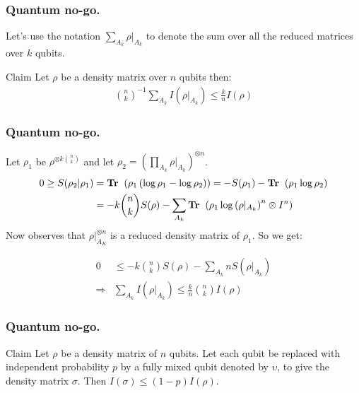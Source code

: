 \documentclass{beamer}
\begin{document}
\begin{frame}
  \frametitle{Quantum no-go.}
  Let's use the notation $\sum_{A_k}\rho|_{A_k}$ to denote the sum over all the reduced matrices over $k$ qubits.  
\begin{block}{Claim}
  Let $\rho$ be a density matrix over $n$ qubits then:  
  \begin{equation*}
    \begin{split}
      { n \choose k }^{-1}\sum_{A_k} I(\rho|_{A_k}) \le \frac{k}{n}I(\rho)
    \end{split}
  \end{equation*}
\end{block}
\end{frame}
\begin{frame}
  \frametitle{Quantum no-go.}
Let $\rho_{1}$ be $\rho^{\otimes k { n \choose k } }$ and let $\rho_{2} = \left( \prod_{A_{k}} \rho |_{A_{k}} \right)^{\otimes n}$.  
  \begin{equation*}
    \begin{split}
      0 \ge S(\rho_{2} | \rho_{1} ) &= \textbf{Tr } \left( \rho_{1} \left( \log \rho_{1} - \log \rho_{2} \right) \right) = -S(\rho_{1}) - \textbf{Tr } \left( \rho_{1} \log \rho_{2} \right) \\ 
      &= -k { n \choose k } S(\rho) - \sum_{A_k} \textbf{Tr } \left( \rho_{1} \log \left( \rho|_{A_{k}} \right)^n \otimes I^n \right)
    \end{split}
  \end{equation*}
  Now observes that $ \rho|_{A_{K}}^{\otimes n} $ is a reduced density matrix of $\rho_{1}$. So we get: 

  \begin{equation*}
    \begin{split}
      0 & \le  -k { n \choose k } S(\rho) - \sum_{A_k} n S\left( \rho |_{A_{k}} \right) \\ 
      \Rightarrow  & \sum_{A_{k}}I\left( \rho|_{A_{k}} \right)\le \frac{k}{n}{ n \choose k } I\left( \rho \right)
    \end{split}
  \end{equation*}
\end{frame}

\begin{frame}
  \frametitle{Quantum no-go.}
\begin{block}{Claim}
  Let $\rho$ be a density matrix of $n$ qubits. Let each qubit be replaced with independent probability $p$ by a fully mixed qubit denoted by $\upsilon$, to give the density matrix $\sigma$. Then $I\left( \sigma \right) \le \left( 1 - p  \right) I \left( \rho \right)$. 
\end{block}
\end{frame}
\end{document}

